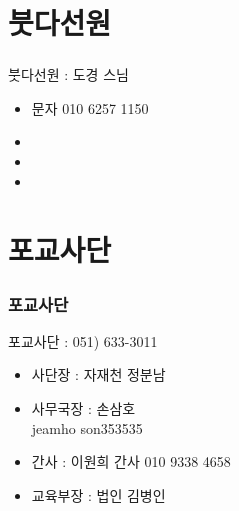 \documentclass[aspectratio=1610,20pt,xcolor=pdftex,dvipsnames,table,handout]{beamer}
\begin{document}
		\section{붓다선원 }
		\begin{frame} [t,plain]
		\frametitle{ }
			\begin{block} {붓다선원 : 도경  스님 }
			\setlength{\leftmargini}{1em}			
			\begin{itemize}
				\item 문자 010 6257 1150
				\item 
				\item 
				\item 
			\end{itemize}
			\end{block}						

		\end{frame}						

		\begin{frame} [t,plain]
		\end{frame}						
		\begin{frame} [t,plain]
		\end{frame}						
		\begin{frame} [t,plain]
		\end{frame}						
			

		\section{포교사단 }

		\begin{frame} [t,plain]
		\frametitle{포교사단 }

			\begin{block} {포교사단  : 051) 633-3011 }
			\setlength{\leftmargini}{2em}			
			\begin{itemize}
				\item 사단장 :  자재천 정분남
				\item 사무국장 :  손삼호  \\ jeamho son353535
				\item 간사 : 이원희 간사 010 9338 4658
				\item 교육부장 :  법인 김병인 \\ 
			\end{itemize}
			\end{block}						


		\end{frame}						
\end{document}
